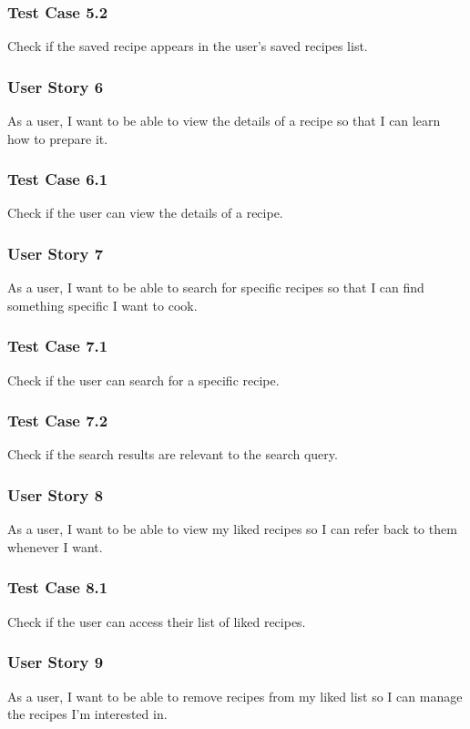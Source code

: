 \documentclass[11pt, letterpaper]{report}
\begin{document}
\subsubsection{Test Case 5.2}
Check if the saved recipe appears in the user's saved recipes list.

\subsubsection{User Story 6}
As a user, I want to be able to view the details of a recipe so that I can learn how to prepare it.

\subsubsection{Test Case 6.1}
Check if the user can view the details of a recipe.

\subsubsection{User Story 7}
As a user, I want to be able to search for specific recipes so that I can find something specific I want to cook.

\subsubsection{Test Case 7.1}
Check if the user can search for a specific recipe.

\subsubsection{Test Case 7.2}
Check if the search results are relevant to the search query.

\subsubsection{User Story 8}
As a user, I want to be able to view my liked recipes so I can refer back to them whenever I want.

\subsubsection{Test Case 8.1}
Check if the user can access their list of liked recipes.

\subsubsection{User Story 9}
As a user, I want to be able to remove recipes from my liked list so I can manage the recipes I'm interested in.
\end{document}
